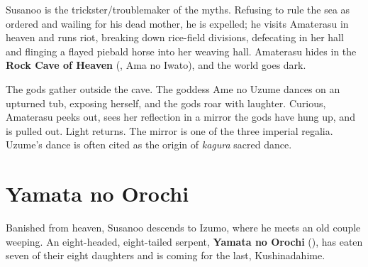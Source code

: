 Susanoo is the trickster/troublemaker of the myths. Refusing to rule the sea as ordered and
wailing for his dead mother, he is expelled; he visits Amaterasu in heaven and runs riot,
breaking down rice-field divisions, defecating in her hall and flinging a flayed piebald
horse into her weaving hall. Amaterasu hides in the \textbf{Rock Cave of Heaven}
(, Ama no Iwato), and the world goes dark.

\begin{example}
The gods gather outside the cave. The goddess Ame no Uzume dances on an upturned tub,
exposing herself, and the gods roar with laughter. Curious, Amaterasu peeks out, sees her
reflection in a mirror the gods have hung up, and is pulled out. Light returns. The mirror
is one of the three imperial regalia. Uzume's dance is often cited as the origin of
\emph{kagura} sacred dance.
\end{example}

\section{Yamata no Orochi}

Banished from heaven, Susanoo descends to Izumo, where he meets an old couple weeping.
An eight-headed, eight-tailed serpent, \textbf{Yamata no Orochi} (), has eaten
seven of their eight daughters and is coming for the last, Kushinadahime.

\begin{center}
\end{center}

